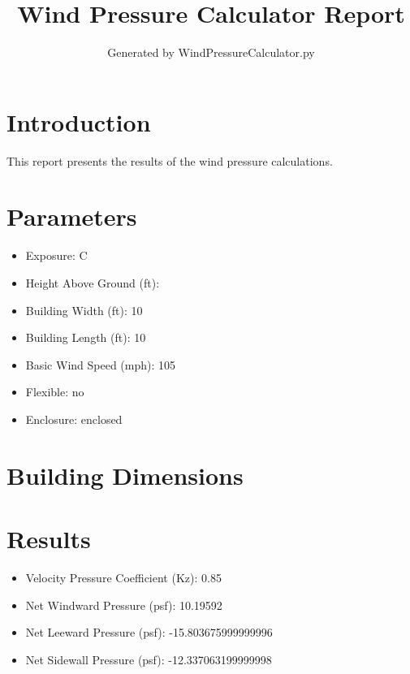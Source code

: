\documentclass{article}
\title{Wind Pressure Calculator Report}
\author{Generated by WindPressureCalculator.py}
\begin{document}
\maketitle

\section{Introduction}
This report presents the results of the wind pressure calculations.

\section{Parameters}
\begin{itemize}
    \item Exposure: C
    \item Height Above Ground (ft): 
    \item Building Width (ft): 10
    \item Building Length (ft): 10
    \item Basic Wind Speed (mph): 105
    \item Flexible: no
    \item Enclosure: enclosed
\end{itemize}

\section{Building Dimensions}

\section{Results}
\begin{itemize}
    \item Velocity Pressure Coefficient (Kz): 0.85
    \item Net Windward Pressure (psf): 10.19592
    \item Net Leeward Pressure (psf): -15.803675999999996
    \item Net Sidewall Pressure (psf): -12.337063199999998
\end{itemize}
\end{document}
